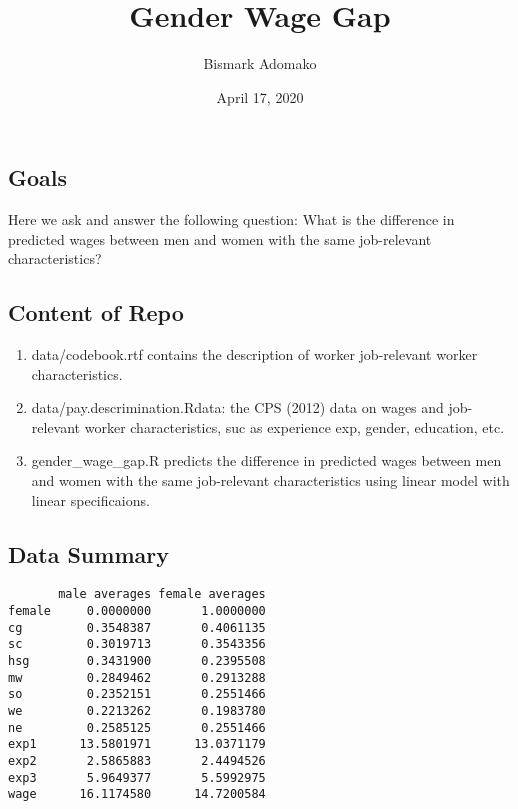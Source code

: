 \documentclass[]{article}
\title{Gender Wage Gap}
\author{Bismark Adomako}
\date{April 17, 2020}
\providecommand{\tightlist}{%
  \setlength{\itemsep}{0pt}\setlength{\parskip}{0pt}}
\begin{document}
\maketitle

\hypertarget{goals}{%
\subsection{Goals}\label{goals}}

Here we ask and answer the following question: What is the difference in
predicted wages between men and women with the same job-relevant
characteristics?

\hypertarget{content-of-repo}{%
\subsection{Content of Repo}\label{content-of-repo}}

\begin{enumerate}
\def\labelenumi{\arabic{enumi}.}
\tightlist
\item
  data/codebook.rtf contains the description of worker job-relevant
  worker characteristics.
\item
  data/pay.descrimination.Rdata: the CPS (2012) data on wages and
  job-relevant worker characteristics, suc as experience exp, gender,
  education, etc.
\item
  gender\_wage\_gap.R predicts the difference in predicted wages between
  men and women with the same job-relevant characteristics using linear
  model with linear specificaions.
\end{enumerate}

\hypertarget{data-summary}{%
\subsection{Data Summary}\label{data-summary}}

\begin{verbatim}
       male averages female averages
female     0.0000000       1.0000000
cg         0.3548387       0.4061135
sc         0.3019713       0.3543356
hsg        0.3431900       0.2395508
mw         0.2849462       0.2913288
so         0.2352151       0.2551466
we         0.2213262       0.1983780
ne         0.2585125       0.2551466
exp1      13.5801971      13.0371179
exp2       2.5865883       2.4494526
exp3       5.9649377       5.5992975
wage      16.1174580      14.7200584
\end{verbatim}
\end{document}
